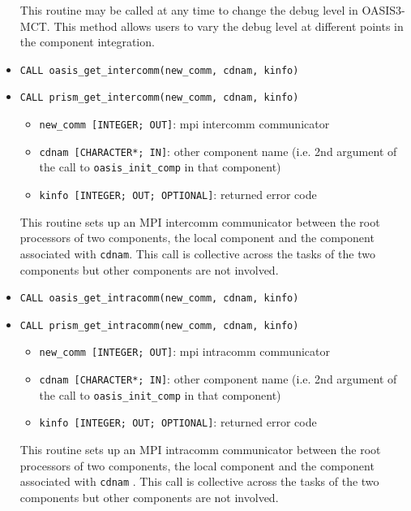 \begin{itemize}
  This routine may be called at any time to change the debug level in
  OASIS3-MCT.  This method allows users to vary the debug level at
  different points in the component integration.

  \vspace{0.2cm}
\item {\tt CALL oasis\_get\_intercomm(new\_comm, cdnam, kinfo)}
\item {\tt CALL prism\_get\_intercomm(new\_comm, cdnam, kinfo)}
  \begin{itemize}
  \item {\tt new\_comm [INTEGER; OUT]}: mpi intercomm communicator
  \item {\tt cdnam [CHARACTER*; IN]}: other component name (i.e. 2nd argument of  the call to {\tt oasis\_init\_comp} in that component)
  \item {\tt kinfo [INTEGER; OUT; OPTIONAL]}: returned error code
  \end{itemize}

  This routine sets up an MPI intercomm communicator between the root
  processors of two components, the local component and the component
  associated with {\tt cdnam}.  This call is collective across the
  tasks of the two components but other components are not involved.

  \vspace{0.2cm}
\item {\tt CALL oasis\_get\_intracomm(new\_comm, cdnam, kinfo)}
\item {\tt CALL prism\_get\_intracomm(new\_comm, cdnam, kinfo)}
  \begin{itemize}
  \item {\tt new\_comm [INTEGER; OUT]}: mpi intracomm communicator
  \item {\tt cdnam [CHARACTER*; IN]}: other component name (i.e. 2nd argument of  the call to {\tt oasis\_init\_comp} in that component)
  \item {\tt kinfo [INTEGER; OUT; OPTIONAL]}: returned error code
  \end{itemize}

  This routine sets up an MPI intracomm communicator between the root
  processors of two components, the local component and the component
  associated with {\tt cdnam} .  This call is collective across the tasks of
  the two components but other components are not involved.


\end{itemize}
